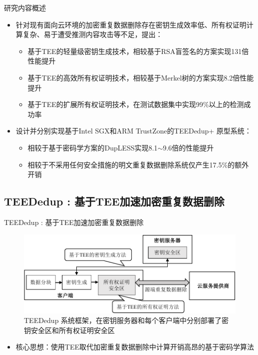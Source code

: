 \documentclass{beamer}
\newcommand{\sysnameS}{TEEDedup }
\newcommand{\prototype}{TEEDedup+ }
\begin{document}
\begin{frame}{研究内容概述}
    \begin{itemize}
        \item 针对现有面向云环境的加密重复数据删除存在密钥生成效率低、所有权证明计算复杂、易于遭受推测内容攻击等不足，提出：
              \begin{itemize}
                \item 基于TEE的轻量级密钥生成技术，相较基于RSA盲签名的方案实现{\color{red}131倍}性能提升
                \item 基于TEE的高效所有权证明技术，相较基于Merkel树的方案实现{\color{red}8.2倍}性能提升
                \item 基于TEE的扩展所有权证明技术，在测试数据集中实现{\color{red}99\%}以上的检测成功率
              \end{itemize}
    \end{itemize}
    \begin{itemize}
        \item 设计并分别实现基于Intel SGX和ARM TrustZone的\prototype 原型系统：
              \begin{itemize}
                \item 相较于基于密码学方案的DupLESS实现{\color{red}8.1$\sim$9.6倍}的性能提升
                \item 相较于不采用任何安全措施的明文重复数据删除系统仅产生{\color{red}17.5\%}的额外开销
              \end{itemize}
    \end{itemize}
\end{frame}

\subsection{\sysnameS: 基于TEE加速加密重复数据删除}

\begin{frame}{\sysnameS: 基于TEE加速加密重复数据删除}
    \begin{figure}[!htb]
        \centering
        \includegraphics[width=\linewidth]{../pic/sgxdedup/sgxdedup-arch.pdf}
        \caption{\sysnameS 系统框架，在密钥服务器和每个客户端中分别部署了密钥安全区和所有权证明安全区}
        \label{fig:sgxdedup-overview}
    \end{figure}
    \vspace{-1em}
    \begin{itemize}
        \item  核心思想：使用TEE取代加密重复数据删除中计算开销高昂的基于密码学算法
    \end{itemize}
\end{frame}
\end{document}
